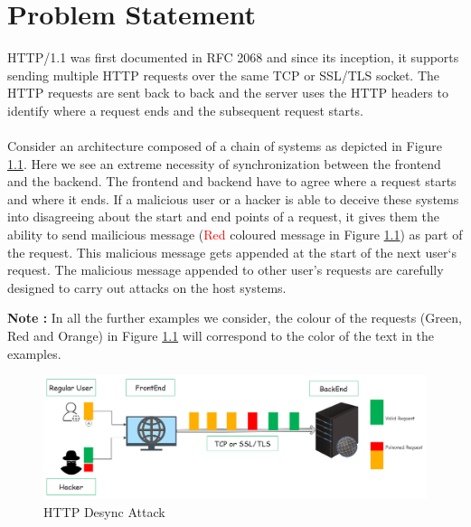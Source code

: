 \chapter{Problem Statement}
HTTP/1.1 was first documented in RFC 2068 \cite{b9} and since its inception, it supports sending multiple HTTP requests over the same TCP or SSL/TLS socket. The HTTP requests are sent back to back and the server uses the HTTP headers to identify where a request ends and the subsequent request starts. \\\\
Consider an architecture composed of a chain of systems as depicted in Figure \ref{fig:HTTP Desync Attack}. Here we see an extreme necessity of synchronization between the frontend and the backend. The frontend and backend have to agree where a request starts and where it ends. If a malicious user or a hacker is able to deceive these systems into disagreeing about the start and end points of a request, it gives them the ability to send mailicious message (\textcolor{red}{Red} coloured message in Figure \ref{fig:HTTP Desync Attack}) as part of the request. This malicious message gets appended at the start of the next user`s request. The malicious message appended to other user's requests are carefully designed to carry out attacks on the host systems. 

\textbf{Note : }In all the further examples we consider, the colour of the requests (\textcolor{mygreen}{Green}, \textcolor{myred}{Red} and \textcolor{myorange}{Orange}) in Figure \ref{fig:HTTP Desync Attack} will correspond to the color of the text in the examples. 
\begin{figure}
	\includegraphics[width=14cm]{images/HTTP_Desync}
	\caption{HTTP Desync Attack}
	\label{fig:HTTP Desync Attack}
\end{figure}


